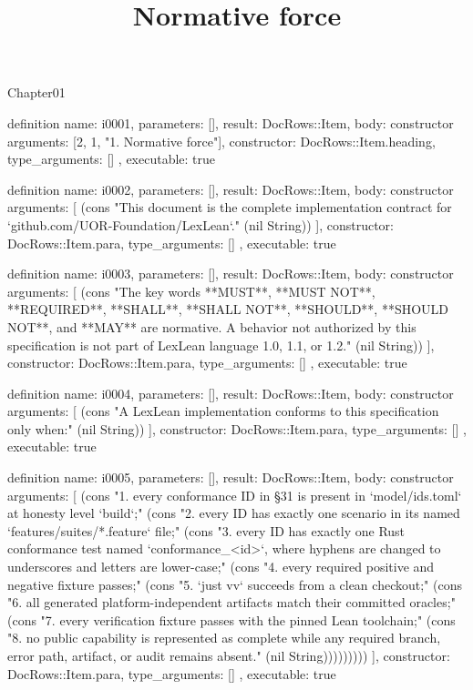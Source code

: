 \begin{lexlean}{Chapter01}
\title{Normative force}
\begin{semanticmodule}
definition{
  name: i0001,
  parameters: [],
  result: DocRows::Item,
  body: constructor{
    arguments: [2, 1, "1. Normative force"],
    constructor: DocRows::Item.heading,
    type_arguments: []
  },
  executable: true
}

definition{
  name: i0002,
  parameters: [],
  result: DocRows::Item,
  body: constructor{
    arguments: [
      (cons "This document is the complete implementation contract for `github.com/UOR-Foundation/LexLean`." (nil String))
    ],
    constructor: DocRows::Item.para,
    type_arguments: []
  },
  executable: true
}

definition{
  name: i0003,
  parameters: [],
  result: DocRows::Item,
  body: constructor{
    arguments: [
      (cons "The key words **MUST**, **MUST NOT**, **REQUIRED**, **SHALL**, **SHALL NOT**, **SHOULD**, **SHOULD NOT**, and **MAY** are normative. A behavior not authorized by this specification is not part of LexLean language 1.0, 1.1, or 1.2." (nil String))
    ],
    constructor: DocRows::Item.para,
    type_arguments: []
  },
  executable: true
}

definition{
  name: i0004,
  parameters: [],
  result: DocRows::Item,
  body: constructor{
    arguments: [
      (cons "A LexLean implementation conforms to this specification only when:" (nil String))
    ],
    constructor: DocRows::Item.para,
    type_arguments: []
  },
  executable: true
}

definition{
  name: i0005,
  parameters: [],
  result: DocRows::Item,
  body: constructor{
    arguments: [
      (cons "1. every conformance ID in §31 is present in `model/ids.toml` at honesty level `build`;" (cons "2. every ID has exactly one scenario in its named `features/suites/*.feature` file;" (cons "3. every ID has exactly one Rust conformance test named `conformance_<id>`, where hyphens are changed to underscores and letters are lower-case;" (cons "4. every required positive and negative fixture passes;" (cons "5. `just vv` succeeds from a clean checkout;" (cons "6. all generated platform-independent artifacts match their committed oracles;" (cons "7. every verification fixture passes with the pinned Lean toolchain;" (cons "8. no public capability is represented as complete while any required branch, error path, artifact, or audit remains absent." (nil String)))))))))
    ],
    constructor: DocRows::Item.para,
    type_arguments: []
  },
  executable: true
}


\end{semanticmodule}
\end{lexlean}
